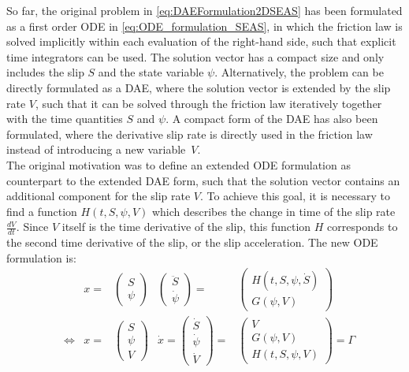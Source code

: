 So far, the original problem in \autoref{eq:DAEFormulation2DSEAS} has been formulated as a first order ODE in \autoref{eq:ODE_formulation_SEAS}, in which the friction law is solved implicitly within each evaluation of the right-hand side, such that explicit time integrators can be used. The solution vector has a compact size and only includes the slip $S$ and the state variable $\psi$. Alternatively, the problem can be directly formulated as a DAE, where the solution vector is extended by the slip rate $V$, such that it can be solved through the friction law iteratively together with the time quantities $S$ and $\psi$. A compact form of the DAE has also been formulated, where the derivative slip rate is directly used in the friction law instead of introducing a new variable~$V$. \\
The original motivation was to define an extended ODE formulation as counterpart to the extended DAE form, such that the solution vector contains an additional component for the slip rate $V$. To achieve this goal, it is necessary to find a function $H(t,S,\psi,V)$ which describes the change in time of the slip rate $\frac{dV}{dt}$. Since $V$ itself is the time derivative of the slip, this function $H$ corresponds to the second time derivative of the slip, or the slip acceleration. The new ODE formulation is: 
\begin{align}
&&	 x      =& \begin{pmatrix}	S                     \\ \psi           \end{pmatrix}      &
	 		   \begin{pmatrix}	\ddot{S}              \\ \dot{\psi}     \end{pmatrix}
			=& \begin{pmatrix}	H(t,S,\psi,\dot{S})   \\ G(\psi, V)     \end{pmatrix}
			 	 		 \\ &\Leftrightarrow&	 		  		 
	 x      =& \begin{pmatrix}	S       \\ \psi       \\ V	            \end{pmatrix}      &
   	\dot{x}  = \begin{pmatrix}	\dot{S} \\ \dot{\psi} \\ \dot{V}        \end{pmatrix}
	 		=& \begin{pmatrix}	 V      \\ G(\psi, V) \\ H(t,S,\psi,V)  \end{pmatrix}
	 		 = \Gamma	
	\label{eq:2nd_order_ODE_formulation}
\end{align}
